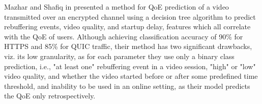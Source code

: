 

Mazhar and Shafiq in \cite{mazhar2018real} presented a method for QoE prediction of a video transmitted over an encrypted channel using a decision tree algorithm to predict rebuffering events, video quality, and startup delay, features which all correlate with the QoE of users. Although achieving classification accuracy of 90\% for HTTPS and 85\% for QUIC traffic, their method has two significant drawbacks, viz. its low granularity, as for each parameter they use only a binary class prediction, i.e., "at least one" rebuffering event in a video session, "high" or "low" video quality, and whether the video started before or after some predefined time threshold, and inability to be used in an online setting, as their model predicts the QoE only retrospectively.

